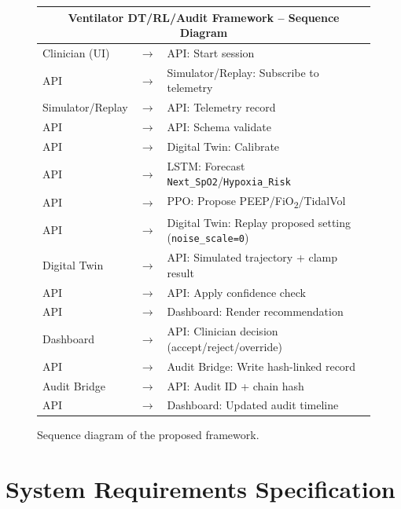 \documentclass[12pt,a4paper,oneside]{report}
\begin{document}
\begin{figure}[h]
\centering
\begin{tabular}{|p{1.7in}p{0.3in}p{3.2in}|}
\hline
\multicolumn{3}{|c|}{\textbf{Ventilator DT/RL/Audit Framework -- Sequence Diagram}}\\
\hline
Clinician (UI) & $\rightarrow$ & API: Start session\\
API & $\rightarrow$ & Simulator/Replay: Subscribe to telemetry\\
Simulator/Replay & $\rightarrow$ & API: Telemetry record\\
API & $\rightarrow$ & API: Schema validate\\
API & $\rightarrow$ & Digital Twin: Calibrate\\
API & $\rightarrow$ & LSTM: Forecast \texttt{Next\_SpO2}/\texttt{Hypoxia\_Risk}\\
API & $\rightarrow$ & PPO: Propose PEEP/FiO\textsubscript{2}/TidalVol\\
API & $\rightarrow$ & Digital Twin: Replay proposed setting (\texttt{noise\_scale=0})\\
Digital Twin & $\rightarrow$ & API: Simulated trajectory + clamp result\\
API & $\rightarrow$ & API: Apply confidence check\\
API & $\rightarrow$ & Dashboard: Render recommendation\\
Dashboard & $\rightarrow$ & API: Clinician decision (accept/reject/override)\\
API & $\rightarrow$ & Audit Bridge: Write hash-linked record\\
Audit Bridge & $\rightarrow$ & API: Audit ID + chain hash\\
API & $\rightarrow$ & Dashboard: Updated audit timeline\\
\hline
\end{tabular}
\caption{Sequence diagram of the proposed framework.}
\label{fig:sequence}
\end{figure}

\section{System Requirements Specification}
\label{sec:srs}
\end{document}
